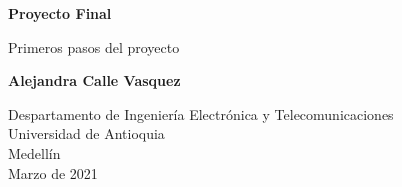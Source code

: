 \documentclass{article}
\begin{document}
\begin{titlepage}
    \begin{center}
        \vspace*{1cm}
            
        \Huge
        \textbf{Proyecto Final}
            
        \vspace{0.5cm}
        \LARGE
        Primeros pasos del proyecto
            
        \vspace{2.3cm}
            
        \textbf{Alejandra Calle Vasquez}
            
        \vfill
            
        \vspace{0.8cm}
            
        \Large
        Despartamento de Ingeniería Electrónica y Telecomunicaciones\\
        Universidad de Antioquia\\
        Medellín\\
        Marzo de 2021
            
    \end{center}
\end{titlepage}


\newpage
\end{document}
